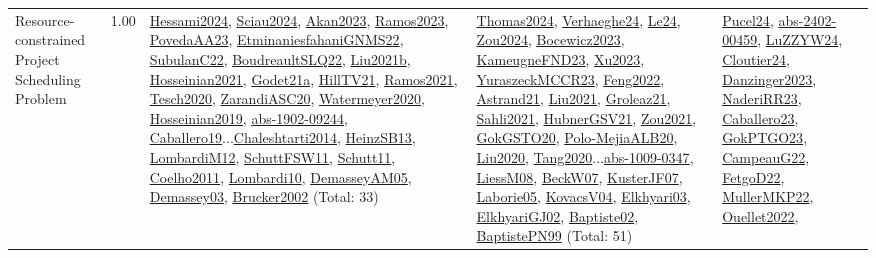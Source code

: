 {\begin{longtable}{p{3cm}r>{\raggedright\arraybackslash}p{6cm}>{\raggedright\arraybackslash}p{6cm}>{\raggedright\arraybackslash}p{8cm}}
\index{Resource-constrained Project Scheduling Problem}\index{Classification!Resource-constrained Project Scheduling Problem}Resource-constrained Project Scheduling Problem &  1.00 & \hyperref[detail:Hessami2024]{Hessami2024}, \hyperref[detail:Sciau2024]{Sciau2024}, \hyperref[detail:Akan2023]{Akan2023}, \hyperref[detail:Ramos2023]{Ramos2023}, \hyperref[detail:PovedaAA23]{PovedaAA23}, \hyperref[detail:EtminaniesfahaniGNMS22]{EtminaniesfahaniGNMS22}, \hyperref[detail:SubulanC22]{SubulanC22}, \hyperref[detail:BoudreaultSLQ22]{BoudreaultSLQ22}, \hyperref[detail:Liu2021b]{Liu2021b}, \hyperref[detail:Hosseinian2021]{Hosseinian2021}, \hyperref[detail:Godet21a]{Godet21a}, \hyperref[detail:HillTV21]{HillTV21}, \hyperref[detail:Ramos2021]{Ramos2021}, \hyperref[detail:Tesch2020]{Tesch2020}, \hyperref[detail:ZarandiASC20]{ZarandiASC20}, \hyperref[detail:Watermeyer2020]{Watermeyer2020}, \hyperref[detail:Hosseinian2019]{Hosseinian2019}, \hyperref[detail:abs-1902-09244]{abs-1902-09244}, \hyperref[detail:Caballero19]{Caballero19}...\hyperref[detail:Chaleshtarti2014]{Chaleshtarti2014}, \hyperref[detail:HeinzSB13]{HeinzSB13}, \hyperref[detail:LombardiM12]{LombardiM12}, \hyperref[detail:SchuttFSW11]{SchuttFSW11}, \hyperref[detail:Schutt11]{Schutt11}, \hyperref[detail:Coelho2011]{Coelho2011}, \hyperref[detail:Lombardi10]{Lombardi10}, \hyperref[detail:DemasseyAM05]{DemasseyAM05}, \hyperref[detail:Demassey03]{Demassey03}, \hyperref[detail:Brucker2002]{Brucker2002} (Total: 33) & \hyperref[detail:Thomas2024]{Thomas2024}, \hyperref[detail:Verhaeghe24]{Verhaeghe24}, \hyperref[detail:Le24]{Le24}, \hyperref[detail:Zou2024]{Zou2024}, \hyperref[detail:Bocewicz2023]{Bocewicz2023}, \hyperref[detail:KameugneFND23]{KameugneFND23}, \hyperref[detail:Xu2023]{Xu2023}, \hyperref[detail:YuraszeckMCCR23]{YuraszeckMCCR23}, \hyperref[detail:Feng2022]{Feng2022}, \hyperref[detail:Astrand21]{Astrand21}, \hyperref[detail:Liu2021]{Liu2021}, \hyperref[detail:Groleaz21]{Groleaz21}, \hyperref[detail:Sahli2021]{Sahli2021}, \hyperref[detail:HubnerGSV21]{HubnerGSV21}, \hyperref[detail:Zou2021]{Zou2021}, \hyperref[detail:GokGSTO20]{GokGSTO20}, \hyperref[detail:Polo-MejiaALB20]{Polo-MejiaALB20}, \hyperref[detail:Liu2020]{Liu2020}, \hyperref[detail:Tang2020]{Tang2020}...\hyperref[detail:abs-1009-0347]{abs-1009-0347}, \hyperref[detail:LiessM08]{LiessM08}, \hyperref[detail:BeckW07]{BeckW07}, \hyperref[detail:KusterJF07]{KusterJF07}, \hyperref[detail:Laborie05]{Laborie05}, \hyperref[detail:KovacsV04]{KovacsV04}, \hyperref[detail:Elkhyari03]{Elkhyari03}, \hyperref[detail:ElkhyariGJ02]{ElkhyariGJ02}, \hyperref[detail:Baptiste02]{Baptiste02}, \hyperref[detail:BaptistePN99]{BaptistePN99} (Total: 51) & \hyperref[detail:Pucel24]{Pucel24}, \hyperref[detail:abs-2402-00459]{abs-2402-00459}, \hyperref[detail:LuZZYW24]{LuZZYW24}, \hyperref[detail:Cloutier24]{Cloutier24}, \hyperref[detail:Danzinger2023]{Danzinger2023}, \hyperref[detail:NaderiRR23]{NaderiRR23}, \hyperref[detail:Caballero23]{Caballero23}, \hyperref[detail:GokPTGO23]{GokPTGO23}, \hyperref[detail:CampeauG22]{CampeauG22}, \hyperref[detail:FetgoD22]{FetgoD22}, \hyperref[detail:MullerMKP22]{MullerMKP22}, \hyperref[detail:Ouellet2022]{Ouellet2022}, 
\end{longtable}}
